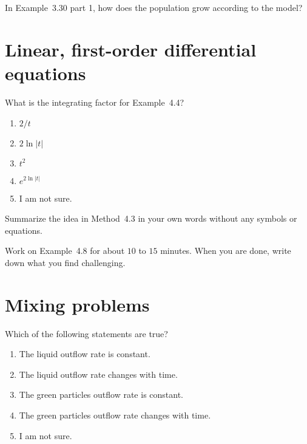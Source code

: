 \documentclass[t, 14pt]{beamer}
\begin{document}
\begin{frame}
  In Example~3.30 part 1, how does the population grow according to the model?

\end{frame}

\section{Linear, first-order differential equations}

\begin{frame}
  What is the integrating factor for Example~4.4?

  \begin{enumerate}
    \item \(2/t\)
    \item \(2\ln|t|\)
    \item \(t^{2}\)
    \item \(e^{2\ln|t|}\)
    \item I am not sure. 
  \end{enumerate}
\end{frame}

\begin{frame}[c]
  Summarize the idea in Method~4.3 in your own words without any symbols or equations.
\end{frame}

\begin{frame}[c]
  Work on Example~4.8 for about \(10\) to \(15\) minutes.  When you are done, write down what you find challenging.
\end{frame}

\section{Mixing problems}

\begin{frame}
  Which of the following statements are true?

  \begin{enumerate} 
    \item The liquid outflow rate is constant.
    \item The liquid outflow rate changes with time.
    \item The green particles outflow rate is constant.
    \item The green particles outflow rate changes with time.
    \item I am not sure.
  \end{enumerate} 
\end{frame}
\end{document}
